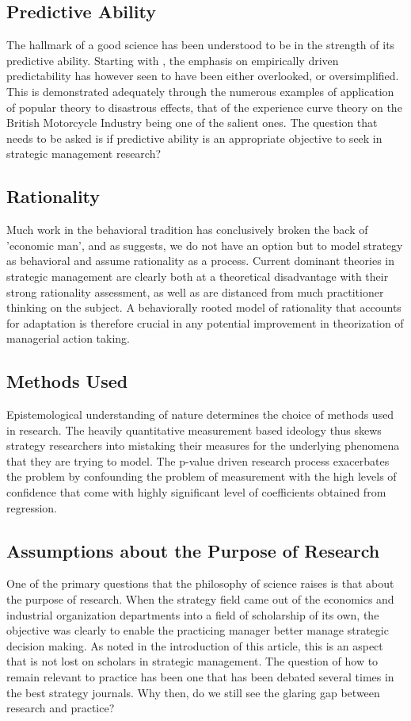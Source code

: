 \documentclass[12pt]{article}
\begin{document}
\subsection{Predictive Ability}
The hallmark of a good science has been understood to be in the strength of its predictive ability. Starting with \cite{Porter1980}, the emphasis on empirically driven predictability has however seen to have been either overlooked, or oversimplified. This is demonstrated adequately through the numerous examples of application of popular theory to disastrous effects, that of the experience curve theory on the British Motorcycle Industry being one of the salient ones. The question that needs to be asked is if predictive ability is an appropriate objective to seek in strategic management research?

\subsection{Rationality}
Much work in the behavioral tradition has conclusively broken the back of 'economic man', and as \cite{Levinthal2011} suggests, we do not have an option but to model strategy as behavioral and assume rationality as a process. Current dominant theories in strategic management are clearly both at a theoretical disadvantage with their strong rationality assessment, as well as are distanced from much practitioner thinking on the subject. A behaviorally rooted model of rationality that accounts for adaptation is therefore crucial in any potential improvement in theorization of managerial action taking.

\subsection{Methods Used}
Epistemological understanding of nature determines the choice of methods used in research. The heavily quantitative measurement based ideology thus skews strategy researchers into mistaking their measures for the underlying phenomena that they are trying to model. The p-value driven research process exacerbates the problem by confounding the problem of measurement with the high levels of confidence that come with highly significant level of coefficients obtained from regression.

\subsection{Assumptions about the Purpose of Research}
One of the primary questions that the philosophy of science raises is that about the purpose of research. When the strategy field came out of the economics and industrial organization departments into a field of scholarship of its own, the objective was clearly to enable the practicing manager better manage strategic decision making. As noted in the introduction of this article, this is an aspect that is not lost on scholars in strategic management. The question of how to remain relevant to practice has been one that has been debated several times in the best strategy journals. Why then, do we still see the glaring gap between research and practice?
\end{document}
